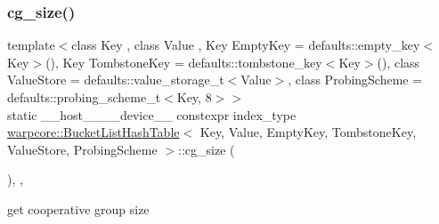 \subsubsection{\texorpdfstring{cg\+\_\+size()}{cg\_size()}}
{\footnotesize\ttfamily template$<$class Key , class Value , Key Empty\+Key = defaults\+::empty\+\_\+key$<$\+Key$>$(), Key Tombstone\+Key = defaults\+::tombstone\+\_\+key$<$\+Key$>$(), class Value\+Store  = defaults\+::value\+\_\+storage\+\_\+t$<$\+Value$>$, class Probing\+Scheme  = defaults\+::probing\+\_\+scheme\+\_\+t$<$\+Key, 8$>$$>$ \\
static \+\_\+\+\_\+host\+\_\+\+\_\+\+\_\+\+\_\+device\+\_\+\+\_\+ constexpr index\+\_\+type \hyperlink{classwarpcore_1_1BucketListHashTable}{warpcore\+::\+Bucket\+List\+Hash\+Table}$<$ Key, Value, Empty\+Key, Tombstone\+Key, Value\+Store, Probing\+Scheme $>$\+::cg\+\_\+size (\begin{DoxyParamCaption}{ }\end{DoxyParamCaption})\hspace{0.3cm}{\ttfamily [inline]}, {\ttfamily [static]}, {\ttfamily [noexcept]}}



get cooperative group size 

